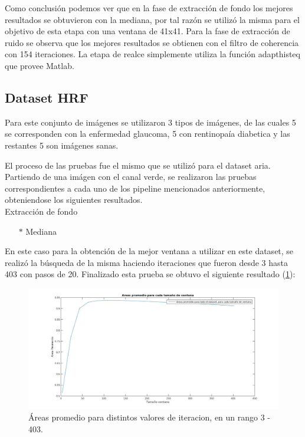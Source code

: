 Como conclusi\'on podemos ver que en la fase de extracci\'on de fondo los mejores resultados se obtuvieron con la mediana, por tal raz\'on se utiliz\'o la misma para el objetivo de esta etapa con una ventana de 41x41. Para la fase de extracci\'on de ruido se observa que los mejores resultados se obtienen con el filtro de coherencia con 154 iteraciones. La etapa de realce simplemente utiliza la funci\'on adapthisteq que provee Matlab.\\




\subsection{Dataset HRF}

Para este conjunto de im\'agenes se utilizaron 3 tipos de im\'agenes, de las cuales 5 se corresponden con la enfermedad glaucoma, 5 con rentinopa\'ia diabetica y las restantes 5 son im\'agenes sanas. 

El proceso de las pruebas fue el mismo que se utiliz\'o para el dataset aria. Partiendo de una im\'agen con el canal verde, se realizaron las pruebas correspondientes a cada uno de los pipeline mencionados anteriormente, obteniendose los siguientes resultados.\\

Extracción de fondo
\begin{itemize}
	\item[$*$]Mediana 
\end{itemize}

En este caso para la obtenci\'on de la mejor ventana a utilizar en este dataset, se realiz\'o la b\'usqueda de la misma haciendo iteraciones que fueron desde 3 hasta 403 con pasos de 20. Finalizado esta prueba se obtuvo el siguiente resultado (\ref{fig:MedianaRangoGrandeHRF}): 

\begin{figure}[H]
	{
	\centering
	\includegraphics[width=1\textwidth]{Figures/MedianaRangoGrandeHRF}
	\caption[Mediana HRF]{\'Areas promedio para distintos valores de iteracion, en un rango 3 - 403.}
	\label{fig:MedianaRangoGrandeHRF}
	}
\end{figure}


